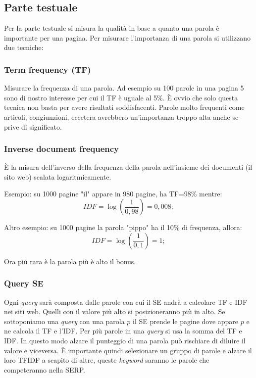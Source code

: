 		\subsection{Parte testuale}
			Per la parte testuale si misura la qualità in base a quanto una parola è importante per una pagina. Per misurare l'importanza di una parola si utilizzano due tecniche:
			
			\subsubsection{Term frequency (TF)}
				Misurare la frequenza di una parola. Ad esempio su 100 parole in una pagina 5 sono di nostro interesse per cui il TF è uguale al 5\%.
				È ovvio che solo questa tecnica non basta per avere risultati soddisfacenti. Parole molto frequenti come articoli, congiunzioni, eccetera avrebbero un'importanza troppo alta anche se prive di significato.
				
			\subsubsection{Inverse document frequency}
				È la misura dell'inverso della frequenza della parola nell'insieme dei documenti (il sito web) scalata logaritmicamente. 
				
				Esempio: su 1000 pagine "il" appare in 980 pagine, ha TF=98\% mentre:
				\[
					IDF=\log(\frac{1}{0,98})=0,008;
				\]
				
				Altro esempio: su 1000 pagine la parola "pippo" ha il 10\% di frequenza, allora:
				\[
				IDF=\log(\frac{1}{0,1})=1;
				\]
				
				Ora più rara è la parola più è alto il bonus.
				
			\subsubsection{Query SE}
				Ogni \emph{query} sarà composta dalle parole con cui il SE andrà a calcolare TF e IDF nei siti web. Quelli con il valore più alto si posizioneranno più in alto.
				Se sottoponiamo una \emph{query} con una parola $p$  il SE prende le pagine dove appare $p$ e ne calcola il TF e l'IDF. Per più parole in una \emph{query} si usa la somma del TF e IDF.
				In questo modo alzare il punteggio di una parola può rischiare di diluire il valore e viceversa. È importante quindi selezionare un gruppo di parole e alzare il loro TFIDF a scapito di altre, queste \emph{keyword} saranno le parole che competeranno nella SERP.
			
